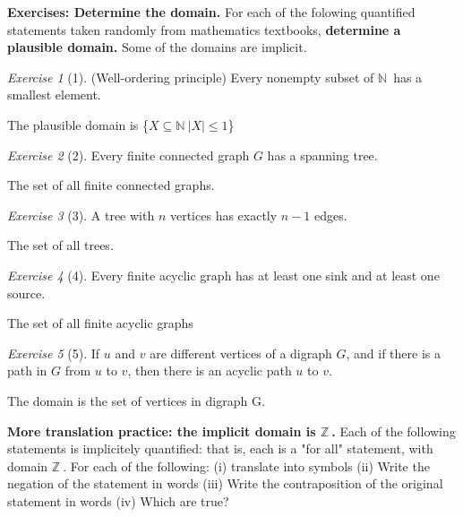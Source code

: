 \documentclass[12pt]{amsart}
\theoremstyle{remark}
\newtheorem*{exercise}{Exercise}%
\newcommand{\NN}{\ensuremath{\mathbb N}}
\newcommand{\ZZ}{\ensuremath{\mathbb Z}}
\theoremstyle{mycomment}
\begin{document}
\thispagestyle{fancy}

\noindent\textbf{Exercises: Determine the domain.} For each of the folowing quantified statements taken randomly from mathematics textbooks, \textbf{ determine a plausible domain.} Some of the domains are implicit.\newline

\begin{exercise}[1] (Well-ordering principle) Every nonempty subset of \NN\ has a smallest element. \newline 

	The plausible domain is \{$X \subseteq \NN\: |X| \leq 1$\} \newline

\end{exercise}

\begin{exercise}[2] Every finite connected graph $G$ has a spanning tree. \newline

	The set of all finite connected graphs.\newline
\end{exercise}
\begin{exercise}[3] A tree with $n$ vertices has exactly $n - 1$ edges. \newline
	
	The set of all trees.\newline
\end{exercise}

\begin{exercise}[4] Every finite acyclic graph has at least one sink and at least one source. \newline
	
	The set of all finite acyclic graphs \newline
\end{exercise}

\begin{exercise}[5] If $u$ and $v$ are different vertices of a digraph $G$, and if there is a path in $G$ from $u$ to $v$, then there is an acyclic path $u$ to $v$. \newline

	The domain is the set of vertices in digraph G.\newline
\end{exercise}

\noindent\textbf{More translation practice: the implicit domain is $\ZZ\ $. } Each of the following statements is implicitely quantified: that is, each is a "for all" statement, with domain $ \ZZ\ .$ For each of the following: \newline
(i) translate into symbols \newline
(ii) Write the negation of the statement in words \newline
(iii) Write the contraposition of the original statement in words \newline
(iv) Which are true? \newline
\end{document}

